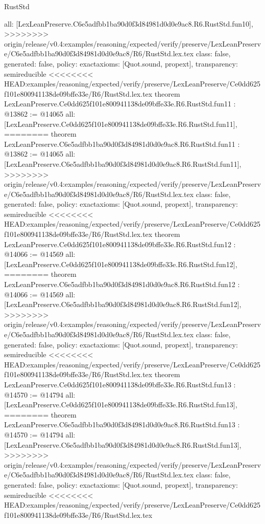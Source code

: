 \begin{lexlean}{RustStd}
\begin{coremodule}
{\begin{coremodule}
{{{{{{{{{{{{{{  all: [LexLeanPreserve.C6e5adfbb1ba90d0f3d84981d0d0e9ac8.R6.RustStd.fun10],
>>>>>>>> origin/release/v0.4:examples/reasoning/expected/verify/preserve/LexLeanPreserve/C6e5adfbb1ba90d0f3d84981d0d0e9ac8/R6/RustStd.lex.tex
  class: false,
  generated: false,
  policy: exact{axioms: [Quot.sound, propext]},
  transparency: semireducible
}
<<<<<<<< HEAD:examples/reasoning/expected/verify/preserve/LexLeanPreserve/Ce0dd625f101e800941138de09bffe33e/R6/RustStd.lex.tex
theorem LexLeanPreserve.Ce0dd625f101e800941138de09bffe33e.R6.RustStd.fun11 : @13862 := @14065 {
  all: [LexLeanPreserve.Ce0dd625f101e800941138de09bffe33e.R6.RustStd.fun11],
========
theorem LexLeanPreserve.C6e5adfbb1ba90d0f3d84981d0d0e9ac8.R6.RustStd.fun11 : @13862 := @14065 {
  all: [LexLeanPreserve.C6e5adfbb1ba90d0f3d84981d0d0e9ac8.R6.RustStd.fun11],
>>>>>>>> origin/release/v0.4:examples/reasoning/expected/verify/preserve/LexLeanPreserve/C6e5adfbb1ba90d0f3d84981d0d0e9ac8/R6/RustStd.lex.tex
  class: false,
  generated: false,
  policy: exact{axioms: [Quot.sound, propext]},
  transparency: semireducible
}
<<<<<<<< HEAD:examples/reasoning/expected/verify/preserve/LexLeanPreserve/Ce0dd625f101e800941138de09bffe33e/R6/RustStd.lex.tex
theorem LexLeanPreserve.Ce0dd625f101e800941138de09bffe33e.R6.RustStd.fun12 : @14066 := @14569 {
  all: [LexLeanPreserve.Ce0dd625f101e800941138de09bffe33e.R6.RustStd.fun12],
========
theorem LexLeanPreserve.C6e5adfbb1ba90d0f3d84981d0d0e9ac8.R6.RustStd.fun12 : @14066 := @14569 {
  all: [LexLeanPreserve.C6e5adfbb1ba90d0f3d84981d0d0e9ac8.R6.RustStd.fun12],
>>>>>>>> origin/release/v0.4:examples/reasoning/expected/verify/preserve/LexLeanPreserve/C6e5adfbb1ba90d0f3d84981d0d0e9ac8/R6/RustStd.lex.tex
  class: false,
  generated: false,
  policy: exact{axioms: [Quot.sound, propext]},
  transparency: semireducible
}
<<<<<<<< HEAD:examples/reasoning/expected/verify/preserve/LexLeanPreserve/Ce0dd625f101e800941138de09bffe33e/R6/RustStd.lex.tex
theorem LexLeanPreserve.Ce0dd625f101e800941138de09bffe33e.R6.RustStd.fun13 : @14570 := @14794 {
  all: [LexLeanPreserve.Ce0dd625f101e800941138de09bffe33e.R6.RustStd.fun13],
========
theorem LexLeanPreserve.C6e5adfbb1ba90d0f3d84981d0d0e9ac8.R6.RustStd.fun13 : @14570 := @14794 {
  all: [LexLeanPreserve.C6e5adfbb1ba90d0f3d84981d0d0e9ac8.R6.RustStd.fun13],
>>>>>>>> origin/release/v0.4:examples/reasoning/expected/verify/preserve/LexLeanPreserve/C6e5adfbb1ba90d0f3d84981d0d0e9ac8/R6/RustStd.lex.tex
  class: false,
  generated: false,
  policy: exact{axioms: [Quot.sound, propext]},
  transparency: semireducible
}
<<<<<<<< HEAD:examples/reasoning/expected/verify/preserve/LexLeanPreserve/Ce0dd625f101e800941138de09bffe33e/R6/RustStd.lex.tex
}}}}}}}}}}}}}}}}
\end{coremodule}}
\end{coremodule}
\end{lexlean}

